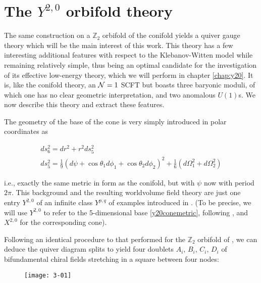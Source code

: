 \section{The $Y^{2,0}$ orbifold theory}\label{sec:squares}

The same construction on a $\mathbb{Z}_2$ orbifold of the conifold yields a quiver gauge theory which will be the main interest of this work. This theory has a few interesting additional features with respect to the Klebanov-Witten model while remaining relatively simple, thus being an optimal candidate for the investigation of its effective low-energy theory, which we will perform in chapter \ref{chap:y20}. It is, like the conifold theory, an $\mathcal{N} = 1$ SCFT but boasts three baryonic moduli, of which one has no clear geometric interpretation, and two anomalous $U(1)$s. We now describe this theory and extract these features.

The geometry of the base of the cone is very simply introduced in polar coordinates as 

\begin{gather}
	ds^2_6 = dr^2 + r^2 ds_5^2\nonumber\\
	ds^2_5 = \frac{1}{9} (d\psi + \cos\theta_1 d\phi_1 + \cos\theta_2 d\phi_2)^2 + \frac{1}{6} (d\Omega_1^2 + d\Omega_2^2)\label{y20conemetric}
\end{gather}

i.e., exactly the same metric in form as the conifold, but with $\psi$ now with period $2\pi$. This background and the resulting worldvolume field theory are just one entry $Y^{2,0}$ of an infinite class $Y^{p,q}$ of examples introduced in \cite{benvenutiInfinite}. (To be precise, we will use $Y^{2,0}$ to refer to the 5-dimensional base \eqref{y20conemetric}, following \cite{ytoozero}, and $X^{2,0}$ for the corresponding cone).

Following an identical procedure to that performed for the $\mathbb{Z}_2$ orbifold of \SYM, we can deduce the quiver diagram splits to yield four doublets $A_i$, $B_i$, $C_i$, $D_i$ of bifundamental chiral fields stretching in a square between four nodes:

\begin{figure}[H]
	\centering
\texttt{[image: 3-01]}
\end{figure}

